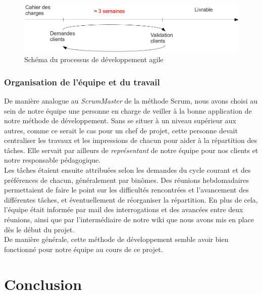 \documentclass[a4paper,11pt]{article}
\begin{document}
\begin{figure}[!ht]
\begin{center}
\includegraphics[width=450px]{methode_agile.png}
\caption{Schéma du processus de développement agile}
\label{agile}
\end{center}
\end{figure}

\subsubsection{Organisation de l'équipe et du travail}

De manière analogue au \textit{ScrumMaster} de la méthode Scrum, nous avons choisi au sein de notre équipe une personne en charge de veiller à la bonne application de notre méthode de développement. Sans se situer à un niveau supérieur aux autres, comme ce serait le cas pour un chef de projet, cette personne devait centraliser les travaux et les impressions de chacun pour aider à la répartition des tâches. Elle servait par ailleurs de \textit{représentant} de notre équipe pour nos clients et notre responsable pédagogique.\\

Les tâches étaient ensuite attribuées selon les demandes du cycle courant et des préférences de chacun, généralement par binômes. Des réunions hebdomadaires permettaient de faire le point sur les difficultés rencontrées et l'avancement des différentes tâches, et éventuellement de réorganiser la répartition. En plus de cela, l'équipe était informée par mail des interrogations et des avancées entre deux réunions, ainsi que par l'intermédiaire de notre wiki que nous avons mis en place dès le début du projet.\\

De manière générale, cette méthode de développement semble avoir bien fonctionné pour notre équipe au cours de ce projet.

\clearpage

\section*{Conclusion}
\end{document}
